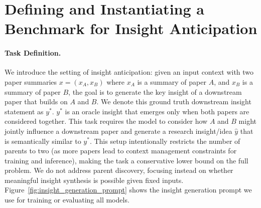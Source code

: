 \section{Defining and Instantiating a Benchmark for Insight Anticipation}
\label{sec:dataset_construction}

\paragraph{Task Definition.} We introduce the setting of insight anticipation: given an input context with two paper summaries $x = (x_A, x_B)$ where $x_A$ is a summary of paper $A$, and $x_B$ is a summary of paper $B$, the goal is to generate the key insight of a downstream paper that builds on $A$ and $B$. We denote this ground truth downstream insight statement as $y^*$. $y^*$ is an oracle insight that emerges only when both papers are considered together. This task requires the model to consider how $A$ and $B$ might jointly influence a downstream paper and generate a research insight/idea $\hat{y}$ that is semantically similar to $y^*$. This setup intentionally restricts the number of parents to two (as more papers lead to context management constraints for training and inference), making the task a conservative lower bound on the full problem. We do not address parent discovery, focusing instead on whether meaningful insight synthesis is possible given fixed inputs. Figure~\ref{fig:insight_generation_prompt} shows the insight generation prompt we use for training or evaluating all models. 


